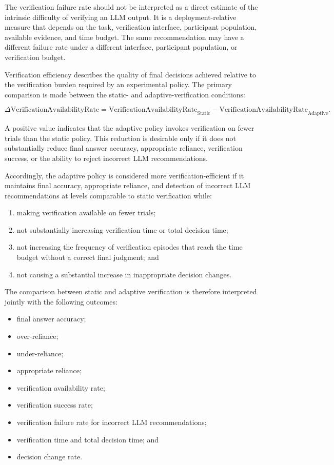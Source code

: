 \documentclass[oneside,final,14pt,a4paper]{extreport}
\theoremstyle{definition}
\theoremstyle{remark}
\begin{document}
The verification failure rate should not be interpreted as a direct estimate of
the intrinsic difficulty of verifying an LLM output. It is a
deployment-relative measure that depends on the task, verification interface,
participant population, available evidence, and time budget. The same
recommendation may have a different failure rate under a different interface,
participant population, or verification budget.

Verification efficiency describes the quality of final decisions achieved
relative to the verification burden required by an experimental policy. The
primary comparison is made between the static- and adaptive-verification
conditions:

\[
\Delta\text{VerificationAvailabilityRate}
=
\text{VerificationAvailabilityRate}_{\text{Static}}
-
\text{VerificationAvailabilityRate}_{\text{Adaptive}}.
\]

A positive value indicates that the adaptive policy invokes verification on
fewer trials than the static policy. This reduction is desirable only if it
does not substantially reduce final answer accuracy, appropriate reliance,
verification success, or the ability to reject incorrect LLM
recommendations.

Accordingly, the adaptive policy is considered more verification-efficient if
it maintains final accuracy, appropriate reliance, and detection of incorrect
LLM recommendations at levels comparable to static verification while:

\begin{enumerate}
    \item making verification available on fewer trials;
    \item not substantially increasing verification time or total decision
    time;
    \item not increasing the frequency of verification episodes that reach the
    time budget without a correct final judgment; and
    \item not causing a substantial increase in inappropriate decision changes.
\end{enumerate}

The comparison between static and adaptive verification is therefore
interpreted jointly with the following outcomes:

\begin{itemize}
    \item final answer accuracy;
    \item over-reliance;
    \item under-reliance;
    \item appropriate reliance;
    \item verification availability rate;
    \item verification success rate;
    \item verification failure rate for incorrect LLM recommendations;
    \item verification time and total decision time; and
    \item decision change rate.
\end{itemize}
\end{document}
